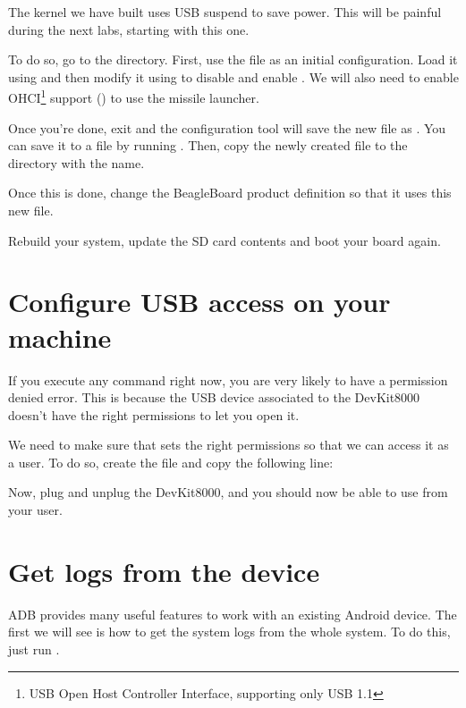 The kernel we have built uses USB suspend to save power. This will
be painful during the next labs, starting with this one.

To do so, go to the  directory. First, use the
 file as an initial configuration. Load
it using  and then modify
it using  to disable
 and enable
. We will also need to enable
OHCI\footnote{USB Open Host Controller Interface, supporting only USB
  1.1} support () to use the missile
launcher.

Once you're done, exit and the configuration tool will save the new
file as . You can save it to a  file by
running . Then, copy the newly
created  file to the  directory
with the  name.

Once this is done, change the BeagleBoard product definition so that
it uses this new file.

Rebuild your system, update the SD card contents and boot your board
again.

\section{Configure USB access on your machine}

If you execute any command right now, you are very likely to have a
permission denied error. This is because the USB device associated to
the DevKit8000 doesn't have the right permissions to let you open it.

We need to make sure that  sets the right permissions so
that we can access it as a user. To do so, create the file
 and copy the following line:


Now, plug and unplug the DevKit8000, and you should now be able to use
 from your user.

\section{Get logs from the device}

ADB provides many useful features to work with an existing Android
device.  The first we will see is how to get the system logs from the
whole system. To do this, just run .

